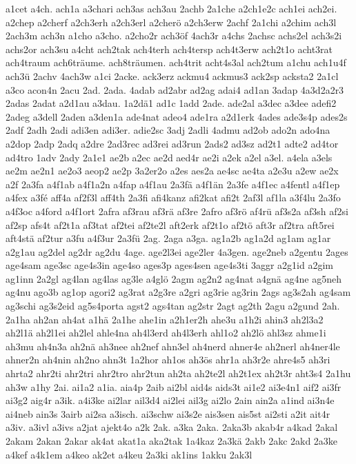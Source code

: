 {a1cet
a4ch.
ach1a
a3chari
ach3as
ach3au
2achb
2a1che
a2ch1e2c
ach1ei
ach2ei.
a2chep
a2cherf
a2ch3erh
a2ch3erl
a2cherö
a2ch3erw
2achf
2a1chi
a2chim
ach3l
2ach3m
ach3n
a1cho
a3cho.
a2cho2r
ach3öf
4ach3r
a4chs
2achsc
achs2el
ach3s2i
achs2or
ach3su
a4cht
ach2tak
ach4terh
ach4tersp
ach4t3erw
ach2t1o
acht3rat
ach4traum
ach6träume.
ach8träumen.
ach4trit
acht4s3al
ach2tum
a1chu
ach1u4f
ach3ü
2achv
4ach3w
a1ci
2acke.
ack3erz
ackmu4
ackmus3
ack2sp
acksta2
2a1cl
a3co
acon4n
2acu
2ad.
2ada.
4adab
ad2abr
ad2ag
adai4
ad1an
3adap
4a3d2a2r3
2adas
2adat
a2d1au
a3dau.
1a2dä1
ad1c
1add
2ade.
ade2al
a3dec
a3dee
adefi2
2adeg
a3dell
2aden
a3den1a
ade4nat
adeo4
ade1ra
a2d1erk
4ades
ade3s4p
ades2s
2adf
2adh
2adi
adi3en
adi3er.
adie2sc
3adj
2adli
4admu
ad2ob
ado2n
ado4na
a2dop
2adp
2adq
a2dre
2ad3rec
ad3rei
ad3run
2ads2
ad3sz
ad2t1
adte2
ad4tor
ad4tro
1adv
2ady
2a1e1
ae2b
a2ec
ae2d
aed4r
ae2i
a2ek
a2el
a3el.
a4ela
a3els
ae2m
ae2n1
ae2o3
aeop2
ae2p
3a2er2o
a2es
aes2a
ae4sc
ae4ta
a2e3u
a2ew
ae2x
a2f
2a3fa
a4f1ab
a4f1a2n
a4fap
a4f1au
2a3fä
a4f1än
2a3fe
a4f1ec
a4fentl
a4f1ep
a4fex
a3fé
aff4a
af2f3l
aff4th
2a3fi
afi4kanz
afi2kat
afi2t
2af3l
af1la
a3f4lu
2a3fo
a4f3oc
a4ford
a4f1ort
2afra
af3rau
af3rä
af3re
2afro
af3rö
af4rü
af3s2a
af3sh
af2si
af2sp
afs4t
af2t1a
af3tat
af2tei
af2te2l
aft2erk
af2t1o
af2tö
aft3r
af2tra
aft5rei
aft4stä
af2tur
a3fu
a4f3ur
2a3fü
2ag.
2aga
a3ga.
ag1a2b
ag1a2d
ag1am
ag1ar
a2g1au
ag2del
ag2dr
ag2du
4age.
age2l3ei
age2ler
4a3gen.
age2neb
a2gentu
2ages
age4sam
age3sc
age4s3in
age4so
ages3p
ages4sen
age4s3ti
3aggr
a2g1id
a2gim
ag1inn
2a2gl
ag4lan
ag4las
ag3le
a4glö
2agm
ag2n2
ag4nat
a4gnä
ag4ne
ag5neh
ag4nu
ago3b
ag1op
agori2
ag3rat
a2g3re
a2gri
ag3rie
ag3rin
2ags
ag3s2ah
ag4sam
ag3schi
ag3s2eid
ag5s4porta
agst2
ags4tan
ag2str
2agt
ag2th
2agu
a2gund
2ah.
2a1ha
ah2an
ah4at
a1hä
2a1he
ahe1in
a2h1er2h
ahe3u
a1h2i
ahin3
ah2l3a2
ah2l1ä
ah2l1ei
ah2lel
ahle4na
ah4l3erd
ah4l3erh
ahl1o2
ah2lö
ahl3sz
ahme1i
ah3mu
ah4n3a
ah2nä
ah3nee
ah2nef
ahn3el
ah4nerd
ahner4e
ah2nerl
ah4ner4le
ahner2n
ah4nin
ah2no
ahn3t
1a2hor
ah1os
ah3ös
ahr1a
ah3r2e
ahre4s5
ah3ri
ahrta2
ahr2ti
ahr2tri
ahr2tro
ahr2tun
ah2ta
ah2te2l
ah2t1ex
ah2t3r
aht3s4
2a1hu
ah3w
a1hy
2ai.
ai1a2
a1ia.
aia4p
2aib
ai2bl
aid4s
aids3t
ai1e2
ai3e4n1
aif2
ai3fr
ai3g2
aig4r
a3ik.
a4i3ke
ai2lar
ail3d4
ai2lei
ail3g
ai2lo
2ain
ain2a
a1ind
ai3n4e
ai4neb
ain3s
3airb
ai2sa
a3isch.
ai3schw
ai3s2e
ais3sen
ais5st
ai2sti
a2it
ait4r
a3iv.
a3ivl
a3ivs
a2jat
ajekt4o
a2k
2ak.
a3ka
2aka.
2aka3b
akab4r
a4kad
2akal
2akam
2akan
2akar
ak4at
akat1a
aka2tak
1a4kaz
2a3kä
2akb
2akc
2akd
2a3ke
a4kef
a4k1em
a4keo
ak2et
a4keu
2a3ki
ak1ins
1akku
2ak3l
}
